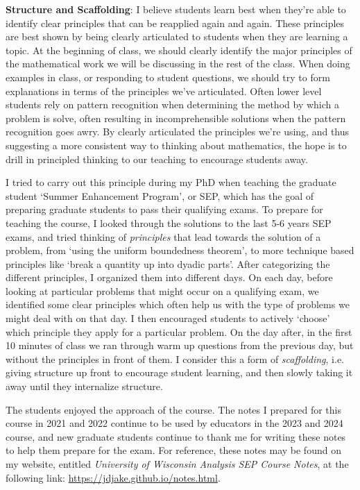 \documentclass[11pt]{article}
\begin{document}
{\bf Structure and Scaffolding}: I believe students learn best when they're able to identify clear principles that can be reapplied again and again. These principles are best shown by being clearly articulated to students when they are learning a topic. At the beginning of class, we should clearly identify the major principles of the mathematical work we will be discussing in the rest of the class. When doing examples in class, or responding to student questions, we should try to form explanations in terms of the principles we've articulated. Often lower level students rely on pattern recognition when determining the method by which a problem is solve, often resulting in incomprehensible solutions when the pattern recognition goes awry. By clearly articulated the principles we're using, and thus suggesting a more consistent way to thinking about mathematics, the hope is to drill in principled thinking to our teaching to encourage students away.

I tried to carry out this principle during my PhD when teaching the graduate student `Summer Enhancement Program', or SEP, which has the goal of preparing graduate students to pass their qualifying exams. To prepare for teaching the course, I looked through the solutions to the last 5-6 years SEP exams, and tried thinking of \emph{principles} that lead towards the solution of a problem, from `using the uniform boundedness theorem', to more technique based principles like `break a quantity up into dyadic parts'. After categorizing the different principles, I organized them into different days. On each day, before looking at particular problems that might occur on a qualifying exam, we identified some clear principles which often help us with the type of problems we might deal with on that day. I then encouraged students to actively `choose' which principle they apply for a particular problem. On the day after, in the first 10 minutes of class we ran through warm up questions from the previous day, but without the principles in front of them. I consider this a form of \emph{scaffolding}, i.e. giving structure up front to encourage student learning, and then slowly taking it away until they internalize structure.

The students enjoyed the approach of the course. The notes I prepared for this course in 2021 and 2022 continue to be used by educators in the 2023 and 2024 course, and new graduate students continue to thank me for writing these notes to help them prepare for the exam. For reference, these notes may be found on my website, entitled \emph{University of Wisconsin Analysis SEP Course Notes}, at the following link: \href{https://jdjake.github.io/notes.html}{https://jdjake.github.io/notes.html}.
\end{document}
